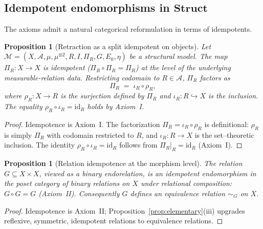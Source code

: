 \documentclass[11pt]{article}
\numberwithin{equation}{section}
\newtheorem{proposition}[theorem]{Proposition}
\theoremstyle{definition}
\begin{document}
\subsection{\texorpdfstring{Idempotent endomorphisms in $\mathbf{Struct}$}{Idempotent endomorphisms in Struct}}

The axioms admit a natural categorical reformulation in terms of idempotents.

\begin{proposition}[Retraction as a split idempotent on objects]\label{prop:retraction-idempotent}
Let $\mathcal M=(X,\allowbreak\mathcal A,\allowbreak\mu,\allowbreak\mu^{\otimes2},\allowbreak R,\allowbreak I,\allowbreak\Pi_R,\allowbreak G,\allowbreak E_0,\allowbreak\eta)$ be a structural model. The map $\Pi_R:X\to X$ is idempotent ($\Pi_R\circ\Pi_R=\Pi_R$) at the level of the underlying measurable-relation data. Restricting codomain to $R\in\mathcal A$, $\Pi_R$ factors as
\[
\Pi_R\;=\;\iota_R\circ\rho_R,
\]
where $\rho_R:X\to R$ is the surjection defined by $\Pi_R$ and $\iota_R:R\hookrightarrow X$ is the inclusion. The equality $\rho_R\circ\iota_R=\mathrm{id}_R$ holds by Axiom~I.
\end{proposition}

\begin{proof}
Idempotence is Axiom~I. The factorization $\Pi_R=\iota_R\circ\rho_R$ is definitional: $\rho_R$ is simply $\Pi_R$ with codomain restricted to $R$, and $\iota_R:R\to X$ is the set--theoretic inclusion. The identity $\rho_R\circ\iota_R=\mathrm{id}_R$ follows from $\Pi_R|_R=\mathrm{id}_R$ (Axiom~I).
\end{proof}

\begin{proposition}[Relation idempotence at the morphism level]\label{prop:G-idempotent}
The relation $G\subseteq X\times X$, viewed as a binary endorelation, is an idempotent endomorphism in the poset category of binary relations on $X$ under relational composition: $G\circ G=G$ (Axiom~II). Consequently $G$ defines an equivalence relation $\sim_G$ on $X$.
\end{proposition}

\begin{proof}
Idempotence is Axiom~II; Proposition~\ref{prop:elementary}(iii) upgrades reflexive, symmetric, idempotent relations to equivalence relations.
\end{proof}
\end{document}
